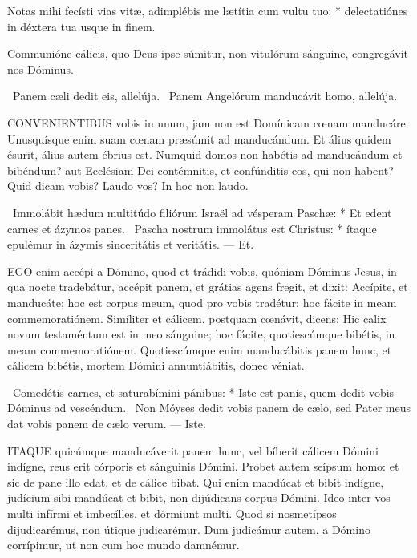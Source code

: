 Notas mihi fecísti vias vitæ, adimplébis me lætítia cum vultu tuo: * delectatiónes in déxtera tua usque in finem.

 Communióne cálicis, quo Deus ipse súmitur, non vitulórum sánguine, congregávit nos Dóminus.

\V\ Panem cæli dedit eis, allelúja. \R\ Panem Angelórum manducávit homo, allelúja.



\lettrine[lines=2]{C}{ONVENIENTIBUS} vobis in unum, jam non est Domínicam cœnam manducáre. Unusquísque enim suam cœnam præsúmit ad manducándum. Et álius quidem ésurit, álius autem ébrius est. Numquid domos non habétis ad manducándum et bibéndum? aut Ecclésiam Dei contémnitis, et confúnditis eos, qui non habent? Quid dicam vobis? Laudo vos? In hoc non laudo.

\R\ Immolábit hædum multitúdo filiórum Israël ad vésperam Paschæ: * Et edent carnes et ázymos panes. \V\ Pascha nostrum immolátus est Christus: * ítaque epulémur in ázymis sinceritátis et veritátis. --- Et.


\lettrine[lines=2]{E}{GO} enim accépi a Dómino, quod et trádidi vobis, quóniam Dóminus Jesus, in qua nocte tradebátur, accépit panem, et grátias agens fregit, et dixit: Accípite, et manducáte; hoc est corpus meum, quod pro vobis tradétur: hoc fácite in meam commemoratiónem. Simíliter et cálicem, postquam cœnávit, dicens: Hic calix novum testaméntum est in meo sánguine; hoc fácite, quotiescúmque bibétis, in meam commemoratiónem. Quotiescúmque enim manducábitis panem hunc, et cálicem bibétis, mortem Dómini annuntiábitis, donec véniat.

\R\ Comedétis carnes, et saturabímini pánibus: * Iste est panis, quem dedit vobis Dóminus ad vescéndum. \V\ Non Móyses dedit vobis panem de cælo, sed Pater meus dat vobis panem de cælo verum. --- Iste.


\lettrine[lines=2]{I}{TAQUE} quicúmque manducáverit panem hunc, vel bíberit cálicem Dómini indígne, reus erit córporis et sánguinis Dómini. Probet autem seípsum homo: et sic de pane illo edat, et de cálice bibat. Qui enim mandúcat et bibit indígne, judícium sibi mandúcat et bibit, non dijúdicans corpus Dómini. Ideo inter vos multi infírmi et imbecílles, et dórmiunt multi. Quod si nosmetípsos dijudicarémus, non útique judicarémur. Dum judicámur autem, a Dómino corrípimur, ut non cum hoc mundo damnémur.

